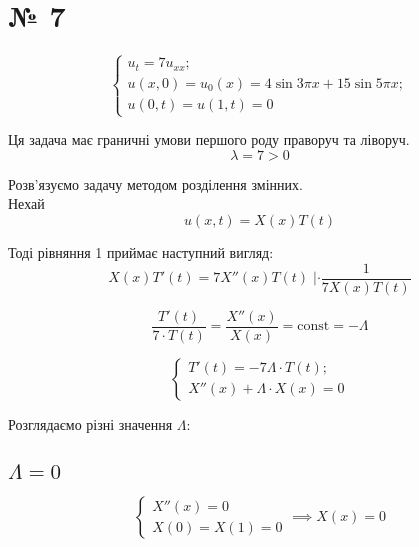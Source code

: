 \documentclass[11pt, a4paper]{article} %
\begin{document}

\section*{№ 7}

\begin{mdframed}
    \begin{equation}
        \begin{cases}
            u_t=7u_{xx};\\
            u(x,0) = u_0(x) = 4\sin 3\pi x + 15 \sin 5\pi x;\\
            u(0,t) = u(1,t) = 0
        \end{cases}    
    \end{equation}
\end{mdframed}

\begin{mdframed}[backgroundcolor=violet!25]
    Ця задача має граничні умови першого роду праворуч та ліворуч.
    $$\lambda = 7 > 0$$
\end{mdframed}

Розв'язуємо задачу методом розділення змінних.\\
Нехай
\begin{equation}
    u(x,t) = X(x)T(t)
\end{equation}

Тоді рівняння 1 приймає наступний вигляд:
\begin{equation}
    X(x) T'(t) = 7 X''(x) T(t) \; | \cdot \frac{1}{7 X(x)T(t)}
\end{equation}

\begin{equation}
    \frac{T'(t)}{7\cdot T(t)} = \frac{X''(x)}{X(x)} = \text{const} = -\Lambda
\end{equation}

\begin{equation}
    \begin{cases}
        T'(t) = -7\Lambda\cdot T(t);\\
        X''(x) + \Lambda \cdot X(x) = 0
    \end{cases}
\end{equation}

Розглядаємо різні значення $\Lambda$:

\subsection*{$\Lambda=0$}
\begin{equation}
    \begin{cases}
        X''(x) = 0\\
        X(0) = X(1) = 0
    \end{cases} \implies X(x) = 0
\end{equation}
\end{document}
